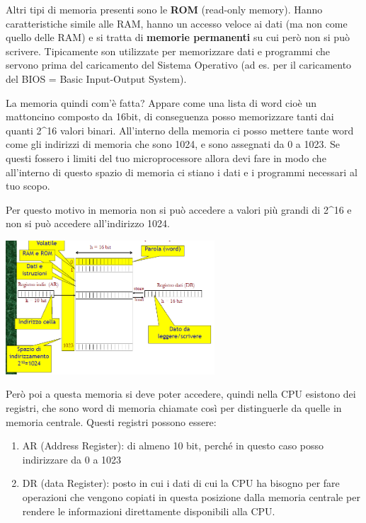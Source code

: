 \documentclass[
  paper=a4,
  oneside  ,captions=tableheading
]{scrbook}
\providecommand{\tightlist}{%
  \setlength{\itemsep}{0pt}\setlength{\parskip}{0pt}}
\begin{document}
Altri tipi di memoria presenti sono le \textbf{ROM} (read-only memory).
Hanno caratteristiche simile alle RAM, hanno un accesso veloce ai dati
(ma non come quello delle RAM) e si tratta di \textbf{memorie
permanenti} su cui però non si può scrivere. Tipicamente son utilizzate
per memorizzare dati e programmi che servono prima del caricamento del
Sistema Operativo (ad es. per il caricamento del BIOS = Basic
Input-Output System).

La memoria quindi com'è fatta? Appare come una lista di word cioè un
mattoncino composto da 16bit, di conseguenza posso memorizzare tanti dai
quanti 2\^{}16 valori binari. All'interno della memoria ci posso mettere
tante word come gli indirizzi di memoria che sono 1024, e sono assegnati
da 0 a 1023. Se questi fossero i limiti del tuo microprocessore allora
devi fare in modo che all'interno di questo spazio di memoria ci stiano
i dati e i programmi necessari al tuo scopo.

Per questo motivo in memoria non si può accedere a valori più grandi di
2\^{}16 e non si può accedere all'indirizzo 1024.

\includegraphics[height=5cm]{./image/image-20201111185631084.png}

Però poi a questa memoria si deve poter accedere, quindi nella CPU
esistono dei registri, che sono word di memoria chiamate così per
distinguerle da quelle in memoria centrale. Questi registri possono
essere:

\begin{enumerate}
\def\labelenumi{\arabic{enumi}.}
\tightlist
\item
  AR (Address Register): di almeno 10 bit, perché in questo caso posso
  indirizzare da 0 a 1023
\item
  DR (data Register): posto in cui i dati di cui la CPU ha bisogno per
  fare operazioni che vengono copiati in questa posizione dalla memoria
  centrale per rendere le informazioni direttamente disponibili alla
  CPU.
\end{enumerate}
\end{document}
